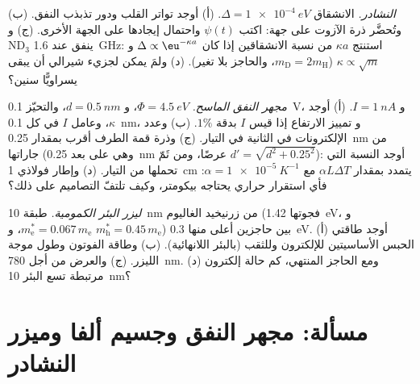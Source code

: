 \begin{exercise}[$\star\star\star$]\label{exo:b2:potential-wells-tunneling:10}
\emph{النشادر.} الانشقاق $\Delta = \qty{1e-4}{eV}$. (أ) أوجد تواتر القلب
ودور تذبذب النفق. (ب) وتُحضَّر ذرة الآزوت على جهة:
اكتب $\psi(t)$ واحتمال إيجادها
على الجهة الأخرى. (ج) و ND$_3$ ينفق عند \qty{1.6}{GHz}: استنتج $\kappa a$
من نسبة الانشقاقين إذا كان $\Delta \propto \eu^{-\kappa a}$ و $\kappa
\propto\sqrt m$ ($m_{\text{D}} = 2m_{\text{H}}$، والحاجز بلا تغير). (د) ولمَ يمكن
لجزيء شيرالي أن يبقى يسراويًّا سنين؟
\end{exercise}

\begin{exercise}[$\star\star\star$]\label{exo:b2:potential-wells-tunneling:11}
\emph{مجهر النفق الماسح.} $\Phi = \qty{4.5}{eV}$، و $d = \qty{0.5}{nm}$، والتحيّز \qty{0.1}{V}،
و $I = \qty{1}{nA}$. (أ) أوجد $\kappa$، وعامل $I$ في كل \qty{0.1}{nm}، و
تمييز الارتفاع إذا قيس $I$ بدقة $1\%$. (ب) وعدد الإلكترونات في الثانية
في التيار. (ج) وذرة قمة الطرف أقرب بمقدار \qty{0.25}{nm} من
جاراتها (وهي على بعد \qty{0.25}{nm} عرضًا، ومن ثَمّ $d' = \sqrt{d^2 + 0.25^2}$):
أوجد النسبة التي تحملها من التيار. (د) وإطار فولاذي \qty{1}{cm} يتمدد
بمقدار $\alpha L\Delta T$ مع $\alpha = \qty{1e-5}{K^{-1}}$: فأي استقرار حراري
يحتاجه بيكومتر، وكيف تلتفّ التصاميم على ذلك؟
\end{exercise}

\begin{exercise}[$\star\star\star$]\label{exo:b2:potential-wells-tunneling:12}
\emph{ليزر البئر الكمومية.} طبقة \qty{10}{nm} من زرنيخيد الغاليوم (فجوتها
\qty{1.42}{eV}، و $m_{\text{e}}^* = 0.067\,m_{\text{e}}$، و $m_{\text{h}}^* = 0.45\,m_{\text{e}}$)
بين حاجزين أعلى منها \qty{0.3}{eV}. (أ) أوجد طاقتي الحبس الأساسيتين
للإلكترون وللثقب (بالبئر اللانهائية). (ب) وطاقة الفوتون وطول موجة
الليزر. (ج) والعرض من أجل \qty{780}{nm}. (د) ومع الحاجز المنتهي،
كم حالة إلكترون مرتبطة تسع البئر \qty{10}{nm}؟
\end{exercise}

\section{مسألة: مجهر النفق وجسيم ألفا وميزر النشادر}

